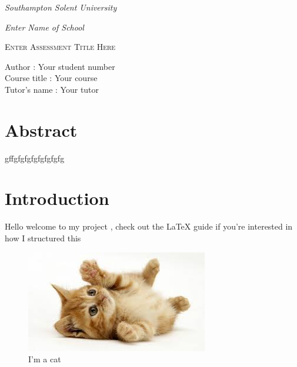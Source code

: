 \documentclass[12pt,a4paper]{article}
\begin{document}
\begin{titlepage}
{\fontsize{14}{12} \emph{Southampton Solent University}\par}
{\fontsize{14}{12}  \emph{Enter Name of School} \par}
\centering
\vspace{10 cm}
{\scshape\Huge Enter Assessment Title Here\par}
\vspace{10cm}	
\begin{flushleft}

Author	        \hspace{1.12cm} 	: Your student number   \\
Course title	\hspace{0.2cm} 	: Your course  \\
Tutor's name	\hspace{0.00cm}       : Your tutor   \\

\end{flushleft}
 
\end{titlepage}

\tableofcontents

\clearpage

\listoffigures

\clearpage


\section{Abstract}
gffgfgfgfgfgfgfgfg 
\section{Introduction}

Hello welcome to my project , check out the LaTeX guide if you're interested in how I structured this  \citep{latex:guide}

\begin{figure}[h!]
	\centering
	\includegraphics{assets/cat.jpeg}
	 \caption{I'm a cat}
	 \label{fig:cat}
\end{figure}
\end{document}
